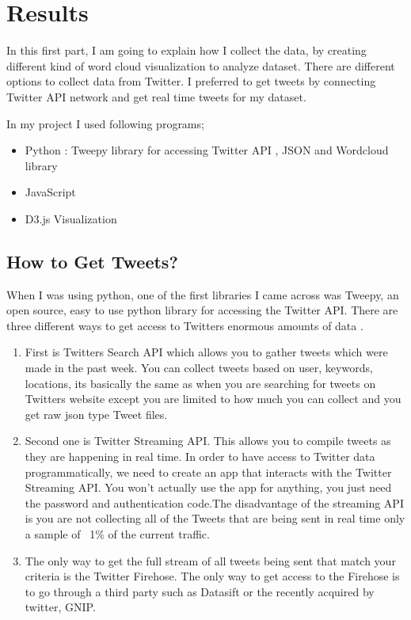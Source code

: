 \documentclass[12pt,notitlepage]{article}
\begin{document}
\section{Results}
\label{sec:popul-train-set}

In this first part, I am going to explain how I collect the data, by creating different kind of word cloud visualization to analyze dataset. There are different options to collect data from Twitter. I preferred to get tweets by connecting Twitter API network and get real time tweets for my dataset. 

In my project I used following programs;
\begin{itemize}
	\item{Python} : Tweepy library for accessing Twitter API , JSON and Wordcloud library 
	\item JavaScript 
	\item D3.js Visualization
\end{itemize}
	
\subsection{How to Get Tweets?} 


	
When I was using python, one of the first libraries I came across was Tweepy, an open source, easy to use python library for accessing the Twitter API. There are three different ways to get access to Twitters enormous amounts of data \cite{Forstyh:2014}. 

\begin{enumerate}
\item First is Twitters Search API which allows you to gather tweets which were made in the past week. You can collect tweets based on user, keywords, locations, its basically the same as when you are searching for tweets on Twitters website except you are limited to how much you can collect and you get raw json type Tweet files. 

\item Second one is Twitter Streaming API. This allows you to compile tweets as they are happening in real time. In order to have access to Twitter data programmatically, we need to create an app that interacts with the Twitter Streaming API. You won't actually use the app for anything, you just need the password and authentication code.The disadvantage of the streaming API is you are not collecting all of the Tweets that are being sent in real time only a sample of ~1\% of the current traffic. 

\item The only way to get the full stream of all tweets being sent that match your criteria is the Twitter Firehose. The only way to get access to the Firehose is to go through a third party such as Datasift or the recently acquired by twitter, GNIP. 
\end{enumerate}
\end{document}
